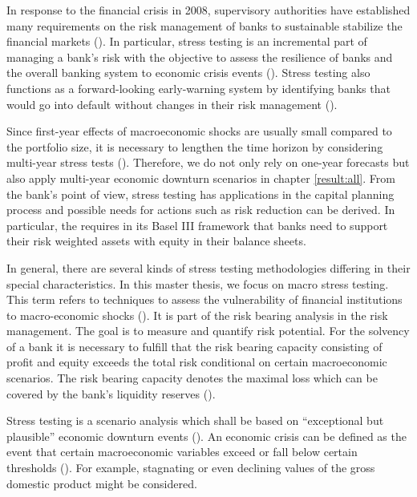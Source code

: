 \documentclass[a4paper, 11pt]{scrreprt}
\begin{document}
In response to the financial crisis in 2008, supervisory authorities have established many requirements on the risk management of banks to sustainable stabilize the financial markets (\textcite[chapter 2.5]{bis2004sorge}). In particular, stress testing is an incremental part of managing a bank's risk with the objective to assess the resilience of banks and the overall banking system to economic crisis events (\textcite[note 2]{eba2018stresstest}). 
Stress testing also functions as a forward-looking early-warning system by identifying banks that would go into default without changes in their risk management (\textcite{bcbs2012macroprudential}).

Since first-year effects of macroeconomic shocks are usually small compared to the portfolio size, it is necessary to lengthen the time horizon by considering multi-year stress tests (\textcite[chapter 4.1.2]{bis2004sorge}). Therefore, we do not only rely on one-year forecasts but also apply multi-year economic downturn scenarios in chapter \ref{result:all}.
From the bank's point of view, stress testing has applications in the capital planning process and possible needs for actions such as risk reduction can be derived.
In particular, the \textcite{bcbs2010baselIII} requires in its Basel III framework that banks need to support their risk weighted assets with equity in their balance sheets.

In general, there are several kinds of stress testing methodologies differing in their special characteristics. In this master thesis, we focus on macro stress testing.
This term refers to techniques to assess the vulnerability of financial institutions to macro-economic shocks (\textcite{imf2001stresstesting}).
It is part of the risk bearing analysis in the risk management. 
The goal is to measure and quantify risk potential. 
For the solvency of a bank it is necessary to fulfill that the risk bearing capacity consisting of profit and equity exceeds the total risk conditional on certain macroeconomic scenarios. The risk bearing capacity denotes the maximal loss which can be covered by the bank's liquidity reserves (\textcite{buba2017icaap}).

Stress testing is a scenario analysis which shall be based on ``exceptional but plausible'' \linebreak economic downturn events (\textcite[guideline 10]{ecb2010cebs}). 
An economic crisis can be defined as the event that certain macroeconomic variables exceed or fall below certain thresholds (\textcite[chapter 1]{bis2004sorge}).
For example, stagnating or even declining values of the gross domestic product might be considered. 
\end{document}
